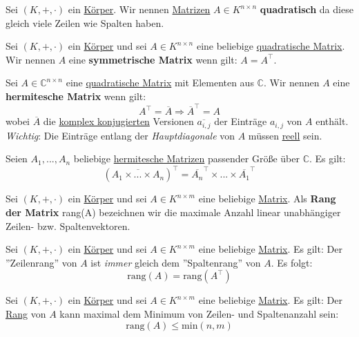 \documentclass[../../main.tex]{subfiles}
\begin{document}
	\begin{definition}
		\label{def:QuadratischeMatrix}
		Sei $(K,+,\cdot)$ ein \hyperref[def:Körper]{Körper}. Wir nennen \hyperref[def:Matrix]{Matrizen} $A \in K^{n \times n}$ \textbf{quadratisch} da diese gleich viele Zeilen wie Spalten haben. 
	\end{definition}
	
	
	\begin{definition}
		\label{def:SymmetrischeMatrix}
		Sei $(K,+,\cdot)$ ein \hyperref[def:Körper]{Körper} und sei $A\in K^{n \times n}$ eine beliebige \hyperref[def:QuadratischeMatrix]{quadratische Matrix}. Wir nennen $A$ eine \textbf{symmetrische Matrix} wenn gilt: $A=A^\top$. 
	\end{definition}

	\begin{definition}
		\label{def:HermitescheMatrix}
		Sei $A \in \mathbb{C}^{n \times n}$ eine \hyperref[def:QuadratischeMatrix]{quadratische Matrix} mit Elementen aus $\mathbb{C}$. Wir nennen $A$ eine \textbf{hermitesche Matrix} wenn gilt: $$A^\top = \overline{A} \Rightarrow \overline{A}^\top = A$$ wobei $\overline{A}$ die \hyperref[def:komplexKonjugiert]{komplex konjugierten} Versionen $\overline{a_{i,j}}$ der Einträge $a_{i,j}$ von $A$ enthält. \textit{Wichtig}: Die Einträge entlang der \textit{Hauptdiagonale} von $A$ müssen \hyperref[def:ReelleZahlen]{reell} sein. 
	\end{definition}

	\begin{theorem}
		Seien $A_1,...,A_n$ beliebige \hyperref[def:HermitescheMatrix]{hermitesche Matrizen} passender Größe über $\mathbb{C}$. Es gilt: $$(\overline{A_1 \times ... \times A_n})^\top = \overline{A_n}^\top \times ... \times \overline{A_1}^\top$$
	\end{theorem}

	\begin{definition}
		\label{def:RangMatrix}
		Sei $(K,+,\cdot)$ ein \hyperref[def:Körper]{Körper} und sei $A\in K^{n \times m}$ eine beliebige \hyperref[def:Matrix]{Matrix}. Als \textbf{Rang der Matrix} \textrm{rang}(A) bezeichnen wir die maximale Anzahl linear unabhängiger Zeilen- bzw. Spaltenvektoren.
	\end{definition}

	\begin{theorem}
		Sei $(K,+,\cdot)$ ein \hyperref[def:Körper]{Körper} und sei $A\in K^{n \times m}$ eine beliebige \hyperref[def:Matrix]{Matrix}. Es gilt: Der ''Zeilenrang'' von $A$ ist \textit{immer} gleich dem ''Spaltenrang'' von $A$. Es folgt: $$\textrm{rang}(A) = \textrm{rang}(A^\top)$$
	\end{theorem}

	\begin{theorem}
		Sei $(K,+,\cdot)$ ein \hyperref[def:Körper]{Körper} und sei $A\in K^{n \times m}$ eine beliebige \hyperref[def:Matrix]{Matrix}. Es gilt: Der \hyperref[def:RangMatrix]{Rang} von $A$ kann maximal dem Minimum von Zeilen- und Spaltenanzahl sein: $$\textrm{rang}(A) \leq \textrm{min}(n,m)$$
	\end{theorem}
	
\end{document}
